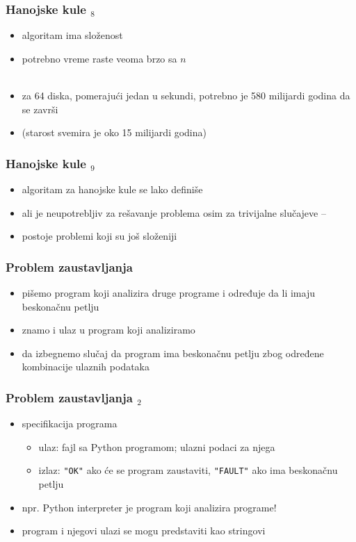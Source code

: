 \documentclass[utf8,compress]{beamer}
\begin{document}
\begin{frame}[fragile]
  \frametitle{Hanojske kule $_8$}
  \begin{itemize}
    \item algoritam ima  složenost
    \item potrebno vreme raste veoma brzo sa $n$ \\ \ \\
    \item za 64 diska, pomerajući jedan u sekundi, potrebno je 580 milijardi godina da se završi
    \item (starost svemira je oko 15 milijardi godina)
  \end{itemize}
\end{frame}

\begin{frame}[fragile]
  \frametitle{Hanojske kule $_9$}
  \begin{itemize}
    \item algoritam za hanojske kule se lako definiše
    \item ali je neupotrebljiv za rešavanje problema osim za trivijalne slučajeve -- 
    \item postoje problemi koji su još složeniji
  \end{itemize}
\end{frame}

\begin{frame}[fragile]
  \frametitle{Problem zaustavljanja}
  \begin{itemize}
    \item pišemo program koji analizira druge programe i određuje da li imaju beskonačnu petlju
    \item znamo i ulaz u program koji analiziramo
    \item da izbegnemo slučaj da program ima beskonačnu petlju zbog određene kombinacije ulaznih podataka
  \end{itemize}
\end{frame}

\begin{frame}[fragile]
  \frametitle{Problem zaustavljanja $_2$}
  \begin{itemize}
    \item specifikacija programa
  \begin{itemize}
    \item ulaz: fajl sa Python programom; ulazni podaci za njega
    \item izlaz: \texttt{"OK"} ako će se program zaustaviti, \texttt{"FAULT"} ako ima beskonačnu petlju 
  \end{itemize}
  	\item npr. Python interpreter je program koji analizira programe!
  	\item program i njegovi ulazi se mogu predstaviti kao stringovi
  \end{itemize}
\end{frame}
\end{document}
